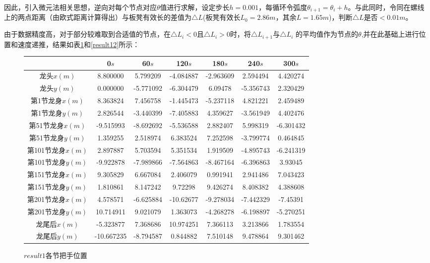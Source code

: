 \documentclass[withoutpreface,bwprint]{cumcmthesis}
\begin{document}
因此，引入微元法相关思想，逆向对每个节点对应$\theta$值进行求解，设定步长$h=0.001$，每循环令弧度$\theta_{i+1}=\theta_i+h$。与此同时，令同在螺线上的两点距离（由欧式距离计算得出）与板凳有效长的差值为$\triangle L$(板凳有效长$L_0=2.86m$，其余$L=1.65m$)，判断$\triangle L$是否$<0.01m$。

由于数据精度高，对于部分较难取到合适值的节点，在$\triangle L_i<0$且$\triangle L_{i}>0$时，将$\triangle L_{i+1}$与$\triangle L_{i}$ 的平均值作为节点的$\theta$,并在此基础上进行位置和速度递推，结果如表\ref{result11}和\ref{result12}所示：  
\begin{figure}[htbp!]
\centering
\begin{tabular}{|c|c|c|c|c|c|c|}
	\hline
	  & 0$s$ & 60$s$ & 120$s$ & 180$s$ & 240$s$ & 300$s$ \\ \hline
	龙头$x(m)$ & 8.800000 & 5.799209 & -4.084887 & -2.963609 & 2.594494 & 4.420274 \\ \hline
	龙头$y(m)$& 0.000000&-5.771092& -6.304479 & 6.09478 & -5.356743 & 2.320429 \\ \hline
	第1节龙身$x(m)$ & 8.363824 &7.456758& -1.445473 & -5.237118 & 4.821221 & 2.459489 \\ \hline
	第1节龙身$y(m)$ & 2.826544 & -3.440399 & -7.405883 & 4.359627 & -3.561949 & 4.402476 \\ \hline
	第51节龙身$x(m)$ & -9.515993 &-8.692692 & -5.536588 & 2.882407 & 5.998319 & -6.301432 \\ \hline
	第51节龙身$y(m)$ & 1.359255 & 2.518974 & 6.383524& 7.252598 & -3.799774 & 0.464845 \\ \hline
	第101节龙身$x(m)$ & 2.897887 & 5.703594 & 5.351534 & 1.919509 & -4.895743 & -6.241319 \\ \hline
	第101节龙身$y(m)$ & -9.922878 & -7.989866 & -7.564863 & -8.467164 & -6.396863& 3.93045 \\ \hline
	第151节龙身$x(m)$ & 9.305829 & 6.667084 & 2.406079 & 0.991941 & 2.941486 & 7.043423 \\ \hline
	第151节龙身$y(m)$ & 1.810861 & 8.147242 & 9.72298 & 9.426274 & 8.408382 & 4.388608 \\ \hline
	第201节龙身$x(m)$ & 4.578571 & -6.625884 & -10.62677 & -9.278034 & -7.442329 & -7.45391 \\ \hline
	第201节龙身$y(m)$ & 10.714911 & 9.021079 & 1.363073 & -4.268278 & -6.198897 & -5.270251 \\ \hline
	龙尾后$x(m)$ & -5.323877 & 7.368686 & 10.974251 & 7.366113 & 3.213866 & 1.783554 \\ \hline
	龙尾后$y(m)$ & -10.667235 & -8.794587 & 0.844882 & 7.510148 & 9.478864 & 9.301462 \\ \hline
\end{tabular}                                              
\caption{$result1$各节把手位置} 
\label{result11}                               
\end{figure}
\end{document}
